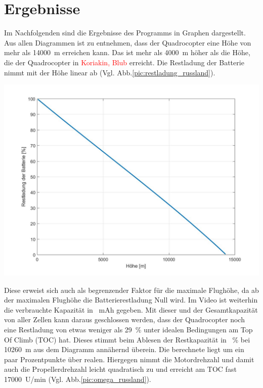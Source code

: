 \section{Ergebnisse}
\label{sec:ergebnisse_quadrocopter}
Im Nachfolgenden sind die Ergebnisse des Programms in Graphen dargestellt. Aus allen Diagrammen ist zu entnehmen, dass der Quadrocopter eine Höhe von mehr als \SI{14000}{m} erreichen kann. Das ist mehr als \SI{4000}{m} höher als die Höhe, die der Quadrocopter in \textcolor{red}{Koriakin, Blub} erreicht.
Die Restladung der Batterie nimmt mit der Höhe linear ab (Vgl. Abb.\ref{pic:restladung_russland}).  
\begin{center}
	\includegraphics[scale=0.3]{Diagramme/C_Rest_V.jpg}
	\label{pic:restladung_russland}
\end{center}
Diese erweist sich auch als begrenzender Faktor für die maximale Flughöhe, da ab der maximalen Flughöhe die Batterierestladung Null wird. Im Video ist weiterhin die verbrauchte Kapazität in \SI{}{mAh} gegeben. Mit dieser und der Gesamtkapazität von aller Zellen kann daraus geschlossen werden, dass der Quadrocopter noch eine Restladung von etwas weniger als \SI{29}{\%} unter idealen Bedingungen am Top Of Climb (TOC) hat. Dieses stimmt beim Ablesen der Restkapazität in \SI{}{\%} bei \SI{10260}{m} aus dem Diagramm annähernd überein. Die berechnete liegt um ein paar Prozentpunkte über realen.
Hiergegen nimmt die Motordrehzahl und damit auch die Propellerdrehzahl leicht quadratisch zu und erreicht am TOC fast \SI{17000}{U/min} (Vgl. Abb.\ref{pic:omega_russland}).  
